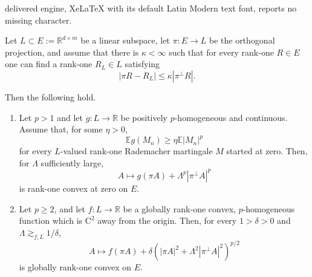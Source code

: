 \documentclass[10pt,a4paper]{amsart}
\newcommand{\R}{\mathbb{R}}
\begin{document}
delivered engine, XeLaTeX with its default Latin Modern text font, reports no missing character.
\begin{lemma}
\label{lem:extension-from-subspace}
Let $L\subset E\mathrel{:=}\R^{d\times m}$ be a linear subspace, let
$\pi\colon E\to L$ be the orthogonal projection, and assume that there is
$\kappa<\infty$ such that for every rank-one $R\in E$ one can find
a rank-one $R_L\in L$ satisfying
\begin{equation}
\label{eq:rank-one-correction}
|\pi R-R_L|
\le
\kappa|\pi^\perp R|.
\end{equation}

Then the following hold.

\begin{enumerate}
\item
Let $p>1$ and let $g\colon L\to\R$ be positively $p$-homogeneous and continuous. Assume that, for
some $\eta>0$,
\[
\mathbb E g(M_n)
\ge
\eta\mathbb E|M_n|^p
\]
for every $L$-valued rank-one Rademacher martingale $M$ started at
zero. Then, for $\Lambda$ sufficiently large,
\[
A\longmapsto
g(\pi A)+\Lambda^p|\pi^\perp A|^p
\]
is rank-one convex at zero on $E$.
\item
Let $p\ge2$, and let $f\colon L\to\R$ be a globally rank-one convex,
$p$-homogeneous function which is $\mathrm{C}^2$ away from the origin.
Then, for every $1>\delta>0$ and $\Lambda\gtrsim_{f,L}1/\delta$,
\begin{equation}
\label{eq:global-p-extension}
A\longmapsto
f(\pi A)
+
\delta
\left(
|\pi A|^2+\Lambda^2|\pi^\perp A|^2
\right)^{p/2}
\end{equation}
is globally rank-one convex on $E$.
\end{enumerate}
\end{lemma}
\end{document}

